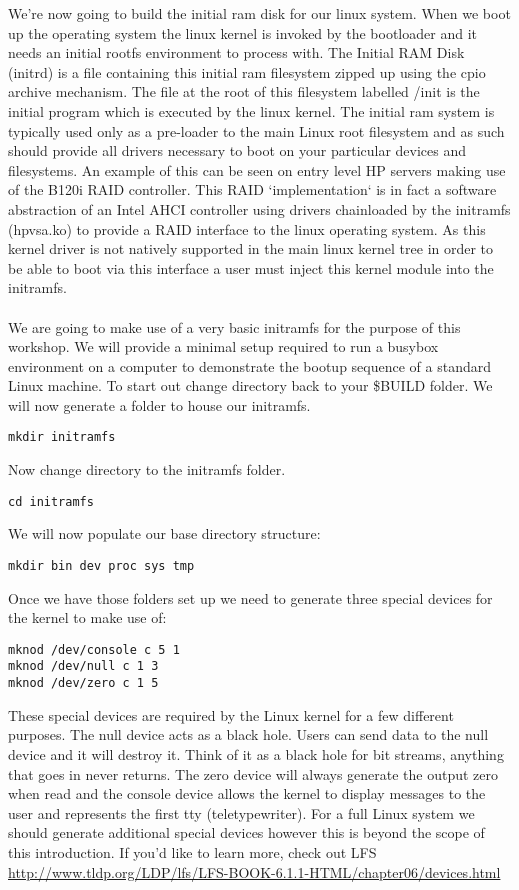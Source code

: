 \documentclass[twocolumn]{article}
\begin{document}
We're now going to build the initial ram disk for our linux system. When we boot up the operating system the linux kernel is invoked by the bootloader and it needs an initial rootfs environment to process with. The Initial RAM Disk (initrd) is a file containing this initial ram filesystem zipped up using the cpio archive mechanism. The file at the root of this filesystem labelled /init is the initial program which is executed by the linux kernel. The initial ram system is typically used only as a pre-loader to the main Linux root filesystem and as such should provide all drivers necessary to boot on your particular devices and filesystems. An example of this can be seen on entry level HP servers making use of the B120i RAID controller. This RAID `implementation` is in fact a software abstraction of an Intel AHCI controller using drivers chainloaded by the initramfs (hpvsa.ko) to provide a RAID interface to the linux operating system. As this kernel driver is not natively supported in the main linux kernel tree in order to be able to boot via this interface a user must inject this kernel module into the initramfs.\\
\\
We are going to make use of a very basic initramfs for the purpose of this workshop. We will provide a minimal setup required to run a busybox environment on a computer to demonstrate the bootup sequence of a standard Linux machine. To start out change directory back to your \$BUILD folder. We will now generate a folder to house our initramfs.
\begin{lstlisting}
mkdir initramfs
\end{lstlisting}
Now change directory to the initramfs folder.
\begin{lstlisting}
cd initramfs
\end{lstlisting}
We will now populate our base directory structure:
\begin{lstlisting}
mkdir bin dev proc sys tmp
\end{lstlisting}
Once we have those folders set up we need to generate three special devices for the kernel to make use of:
\begin{lstlisting}
mknod /dev/console c 5 1
mknod /dev/null c 1 3
mknod /dev/zero c 1 5
\end{lstlisting}
These special devices are required by the Linux kernel for a few different purposes. The null device acts as a black hole. Users can send data to the null device and it will destroy it. Think of it as a black hole for bit streams, anything that goes in never returns. The zero device will always generate the output zero when read and the console device allows the kernel to display messages to the user and represents the first tty (teletypewriter). For a full Linux system we should generate additional special devices however this is beyond the scope of this introduction. If you'd like to learn more, check out LFS \url{http://www.tldp.org/LDP/lfs/LFS-BOOK-6.1.1-HTML/chapter06/devices.html}\\
\end{document}
